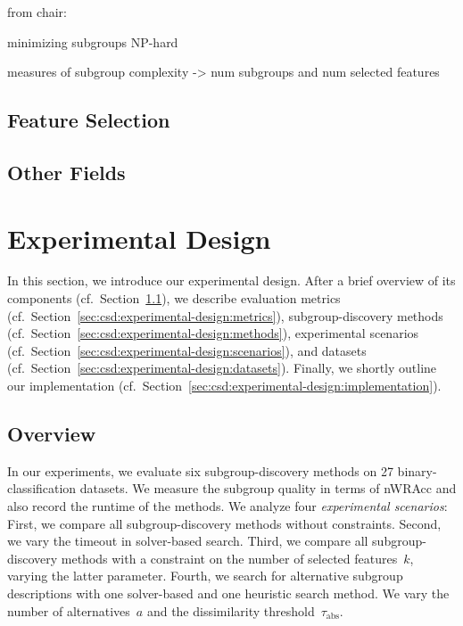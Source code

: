 \documentclass{article}
\theoremstyle{definition}
\begin{document}
from chair: \cite{arzamasov2021reds} \cite{arzamasov2022pedagogical} \cite{vollmer2019informative}

minimizing subgroups NP-hard~\cite{boley2009non}

measures of subgroup complexity \cite{helal2016subgroup, herrera2011overview, ventura2018subgroup} -> num subgroups and num selected features

\subsection{Feature Selection}
\label{sec:csd:related-work:feature-selection}

\cite{bach2022empirical} \cite{bach2023finding, bach2024alternative}

\subsection{Other Fields}
\label{sec:csd:related-work:other}

\cite{bailey2014alternative} \cite{grossi2017survey}
\cite{guidotti2022counterfactual}
\cite{narodytska2018learning} \cite{schidler2021sat} \cite{yu2021learning}

\section{Experimental Design}
\label{sec:csd:experimental-design}

In this section, we introduce our experimental design.
After a brief overview of its components (cf.~Section~\ref{sec:csd:experimental-design:overview}), we describe evaluation metrics (cf.~Section~\ref{sec:csd:experimental-design:metrics}), subgroup-discovery methods (cf.~Section~\ref{sec:csd:experimental-design:methods}), experimental scenarios (cf.~Section~\ref{sec:csd:experimental-design:scenarios}), and datasets (cf.~Section~\ref{sec:csd:experimental-design:datasets}).
Finally, we shortly outline our implementation (cf.~Section~\ref{sec:csd:experimental-design:implementation}).

\subsection{Overview}
\label{sec:csd:experimental-design:overview}

In our experiments, we evaluate six subgroup-discovery methods on 27 binary-classification datasets.
We measure the subgroup quality in terms of nWRAcc and also record the runtime of the methods.
We analyze four \emph{experimental scenarios}:
First, we compare all subgroup-discovery methods without constraints.
Second, we vary the timeout in solver-based search.
Third, we compare all subgroup-discovery methods with a constraint on the number of selected features~$k$, varying the latter parameter.
Fourth, we search for alternative subgroup descriptions with one solver-based and one heuristic search method.
We vary the number of alternatives~$a$ and the dissimilarity threshold~$\tau_{\text{abs}}$.
\end{document}
